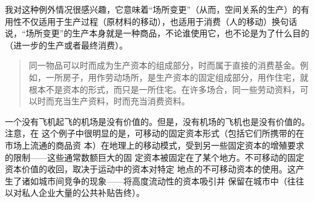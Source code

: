 我对这种例外情况很感兴趣，它意味着“场所变更”（从而，空间关系的生产）的有用性不仅适用于生产过程（原材料的移动），也适用于消费（人的移动）换句话说，“场所变更”的生产本身就是一种商品，不论谁使用它，也不论是为了什么目的（进一步的生产或者最终消费）。

\begin{quotation}
同一物品可以时而成为生产资本的组成部分，时而属于直接的消费基金。例如，一所房子，用作劳动场所，是生产资本的固定组成部分，用作住宅，就根本不是资本的形式，而只是一所住宅。在许多场合，同一些劳动资料，可以时而充当生产资料，时而充当消费资料。 

\end{quotation}
一个没有飞机起飞的机场是没有价值的。但是，没有机场的飞机也是没有价值的。注意，在
这个例子中很明显的是，可移动的固定资本形式（包括它们所携带的在市场上流通的商品资
本）在地理上的移动模式，受到另一些固定资本的增殖要求的限制——这些通常数额巨大的固
定资本被固定在了某个地方。不可移动的固定资本价值的收回，取决于运动中的资本对特定
地点的不可移动资本的使用。这产生了诸如城市间竞争的现象——将高度流动性的资本吸引并
保留在城市中（往往以对私人企业大量的公共补贴告终）。

